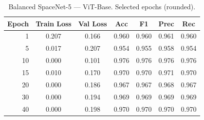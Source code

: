 \begin{table}[!t]
\centering
\caption{Balanced SpaceNet-5 — ViT-Base. Selected epochs (rounded).}
\label{tab:bal_vit_subset}
\begin{tabular}{r
S[table-format=1.3]
S[table-format=1.3]
S[table-format=1.3]
S[table-format=1.3]
S[table-format=1.3]
S[table-format=1.3]}
\toprule
\textbf{Epoch} & \textbf{Train Loss} & \textbf{Val Loss} & \textbf{Acc} & \textbf{F1} & \textbf{Prec} & \textbf{Rec} \\
  & 0.207 & 0.166 & 0.960 & 0.960 & 0.961 & 0.960 \\
 5  & 0.017 & 0.207 & 0.954 & 0.955 & 0.958 & 0.954 \\
10  & 0.000 & 0.101 & 0.976 & 0.976 & 0.976 & 0.976 \\
15  & 0.010 & 0.170 & 0.970 & 0.970 & 0.971 & 0.970 \\
20  & 0.000 & 0.186 & 0.967 & 0.967 & 0.968 & 0.967 \\
30  & 0.000 & 0.194 & 0.969 & 0.969 & 0.969 & 0.969 \\
40  & 0.000 & 0.198 & 0.970 & 0.970 & 0.970 & 0.970 \\
\bottomrule
\end{tabular}
\end{table}

\FloatBarrier  %

